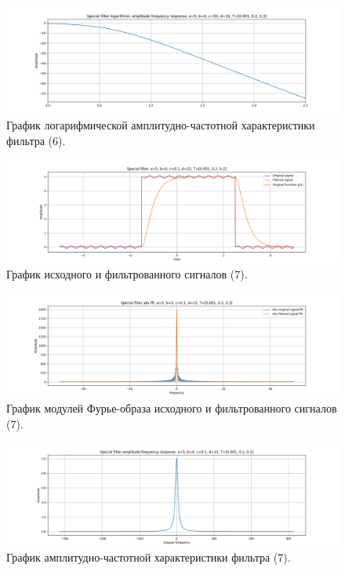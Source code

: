 \documentclass[a4paper, 12pt]{article}
\begin{document}
    \begin{figure}[H]
        \centering
        \includegraphics[scale=0.4]{6_fl2_lafr.png}
        \captionsetup{skip=0pt}
        \caption{График логарифмической амплитудно-частотной характеристики фильтра (6).}
        \label{fig:filinlafr26}
    \end{figure}
    \begin{figure}[H]
        \centering
        \includegraphics[scale=0.4]{7_fl2.png}
        \captionsetup{skip=0pt}
        \caption{График исходного и фильтрованного сигналов (7).}
        \label{fig:filin27}
    \end{figure}
    \begin{figure}[H]
        \centering
        \includegraphics[scale=0.4]{7_fl2_abs.png}
        \captionsetup{skip=0pt}
        \caption{График модулей Фурье-образа исходного и фильтрованного сигналов (7).}
        \label{fig:filinabs27}
    \end{figure}
    \begin{figure}[H]
        \centering
        \includegraphics[scale=0.4]{7_fl2_afr.png}
        \captionsetup{skip=0pt}
        \caption{График амплитудно-частотной характеристики фильтра (7).}
        \label{fig:filinafr27}
    \end{figure}
\end{document}
